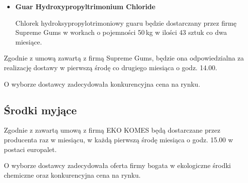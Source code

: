 \begin{itemize}
	\item \textbf{Guar Hydroxypropyltrimonium Chloride}

	Chlorek hydroksypropylotrimoniowy guaru będzie dostarczany przez firmę \textsf{Supreme Gums} w workach o pojemności 50\,kg w ilości 43 sztuk co dwa miesiące.
\end{itemize}\vspace{\baselineskip}

	Zgodnie z umową zawartą z firmą \textsf{Supreme Gums}, będzie ona odpowiedzialna za realizację dostawy w pierwszą środę co drugiego miesiąca o godz. 14.00.

	O wyborze dostawcy zadecydowała konkurencyjna cena na rynku.

\subsection{Środki myjące}

	Zgodnie z zawartą umową z firmą \textsf{EKO KOMES} będą dostarczane przez producenta raz w miesiącu, w każdą pierwszą środę miesiąca o godz. 15.00  w postaci europalet.

	O wyborze dostawcy zadecydowała oferta firmy bogata w ekologiczne środki chemiczne oraz konkurencyjna cena na rynku.

